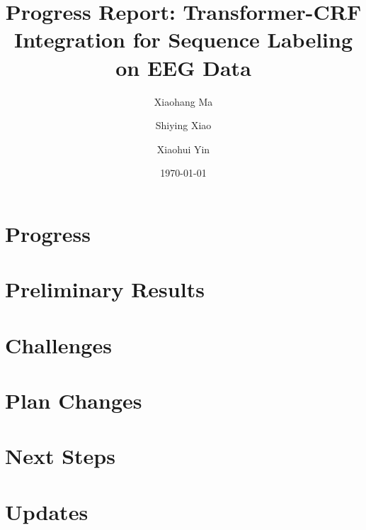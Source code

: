 \documentclass[12pt]{article}
\begin{document}
\title{Progress Report: Transformer-CRF Integration for Sequence Labeling on
EEG Data}

\author[1]{Xiaohang Ma}
\author[2]{Shiying Xiao}
\author[2]{Xiaohui Yin}


\date{\today}

\maketitle


\section{Progress}


\section{Preliminary Results}


\section{Challenges}


\section{Plan Changes}


\section{Next Steps}


\section{Updates}
\end{document}
